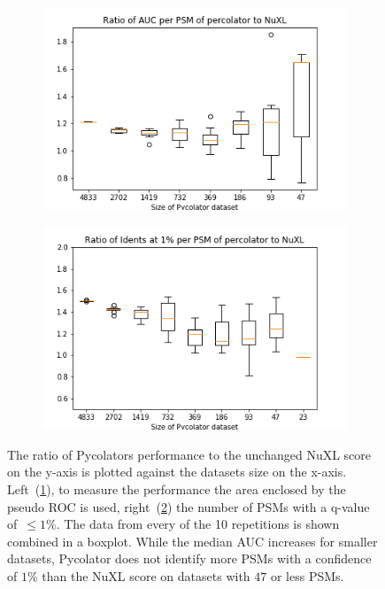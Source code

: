 \begin{figure}
	\normalsize
	\centering
	\begin{subfigure}{0.49 \textwidth}
		\includegraphics[width = \textwidth]{figures/auc_p_vs_ori.png}
		\caption{}
		\label{fig:results:small_dataset_snd_comparison_auc}
	\end{subfigure}
	\hfill
	\begin{subfigure}{0.49 \textwidth}
		\includegraphics[width = \textwidth]{figures/idents_p_vs_ori_zoomed.png}
		\caption{}
		\label{fig:results:small_dataset_snd_comparison_idents}
	\end{subfigure}
	\caption[Performance of Pycolator on smaller datasets]{The ratio of Pycolators performance to the unchanged NuXL score on the y-axis is plotted against the datasets size on the x-axis. Left~(\ref{fig:results:small_dataset_snd_comparison_auc}), to measure the performance the area enclosed by the pseudo ROC is used, right~(\ref{fig:results:small_dataset_snd_comparison_idents}) the number of PSMs with a q-value of~$\leq1\%$. The data from every of the 10 repetitions is shown combined in a boxplot. While the median AUC increases for smaller datasets, Pycolator does not identify more PSMs with a confidence of $1\%$ than the NuXL score on datasets with $47$ or less PSMs.}
	\label{fig:results:small_dataset_snd_comparison}
\end{figure}
\renewcommand{\baselinestretch}{1}
	